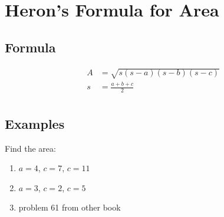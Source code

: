 \documentclass{exam}
\begin{document}
  \section{Heron's Formula for Area}

  \subsection{Formula}
  \begin{align*}
    A & = \sqrt{s (s - a)(s - b)(s - c)} \\
    s & = \frac{a + b + c}{2} \\
  \end{align*}

  \subsection{Examples}
  
  Find the area:
  \begin{enumerate}
    \item $a = 4$, $c = 7$, $c = 11$
    \item $a = 3$, $c = 2$, $c = 5$

    \item problem 61 from other book
  \end{enumerate}
\end{document}
